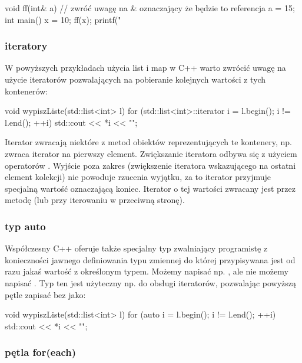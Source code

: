 \begin{CodeFrame*}[c]{}
void ff(int& a) { // zwróć uwagę na & oznaczający że będzie to referencja
    a = 15;
}
int main() {
    x = 10;
    ff(x);
    printf("%
}
\end{CodeFrame*}

\subsubsection{iteratory}

W powyższych przykładach użycia list i map w C++ warto zwrócić uwagę na użycie iteratorów pozwalających na pobieranie kolejnych wartości z tych kontenerów:

\begin{CodeFrame*}[cpp]{}
void wypiszListe(std::list<int> l) {
    for (std::list<int>::iterator i = l.begin(); i != l.end(); ++i) {
        std::cout << *i << "\n";
    }
}
\end{CodeFrame*}

Iterator zwracają niektóre z metod obiektów reprezentujących te kontenery, np.  zwraca iterator na pierwszy element.
Zwiększanie iteratora odbywa się z użyciem operatorów \cpp{++}.
Wyjście poza zakres (zwiększenie iteratora wskazującego na ostatni element kolekcji) nie powoduje rzucenia wyjątku, za to iterator przyjmuje specjalną wartość oznaczającą koniec.
Iterator o tej wartości zwracany jest przez metodę  (lub  przy iterowaniu w przeciwną stronę).

\subsubsection{typ auto}

Współczesny C++ oferuje także specjalny typ  zwalniający programistę z konieczności jawnego definiowania typu zmiennej do której przypisywana jest od razu jakaś wartość z określonym typem. Możemy napisać np. , ale nie możemy napisać . Typ ten jest użyteczny np. do obsługi iteratorów, pozwalając powyższą pętle zapisać bez  jako:

\begin{CodeFrame*}[cpp]{}
void wypiszListe(std::list<int> l) {
    for (auto i = l.begin(); i != l.end(); ++i) {
        std::cout << *i << "\n";
    }
}
\end{CodeFrame*}

\subsubsection{pętla for(each)}

